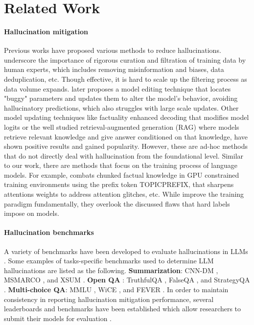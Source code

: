\section{Related Work}
\paragraph{Hallucination mitigation}
Previous works have proposed various methods to reduce hallucinations. 
\citet{radford2019language} underscore the importance of rigorous curation and filtration of training data by human experts, which includes removing misinformation and biases, data deduplication, etc. Though effective, it is hard to scale up the filtering process as data volume expands. 
\citet{meng2022locating} later proposes a model editing technique that locates "buggy" parameters and updates them to alter the model's behavior, avoiding hallucinatory predictions, which also struggles with large scale updates. 
Other model updating techniques like factuality enhanced decoding that modifies model logits \cite{lee2022factuality} or the well studied retrieval-augmented generation (RAG) \cite{shuster2021retrieval, lewis2020retrieval, guu2020retrieval} where models retrieve relevant knowledge and give answer conditioned on that knowledge, have shown positive results and gained popularity. However, these are ad-hoc methods that do not directly deal with hallucination from the foundational level. 
Similar to our work, there are methods that focus on the training process of language models. 
For example, \citet{lee2022factuality} combats chunked factual knowledge in GPU constrained training environments using the prefix token TOPICPREFIX, \cite{liu2024exposing} that sharpens attentions weights to address attention glitches, etc. While improve the training paradigm fundamentally, they overlook the discussed flaws that hard labels impose on models.

\paragraph{Hallucination benchmarks}
A variety of benchmarks have been developed to evaluate hallucinations in LLMs \cite{tonmoy2024comprehensive}. Some examples of tasks-specific benchmarks used to determine LLM hallucinations are listed as the following.
\textbf{Summarization}: CNN-DM \cite{see-etal-2017-get}, MSMARCO \cite{msmarco}, and XSUM \cite{narayan-etal-2018-dont}.
\textbf{Open QA} : TruthfulQA \cite{lin2022truthfulqa}, FalseQA \cite{hu-etal-2023-wont}, and StrategyQA \cite{geva-etal-2021-aristotle}.
\textbf{Multi-choice QA}: MMLU \cite{mmlu}, WiCE \cite{kamoi-etal-2023-wice}, and FEVER \cite{thorne-etal-2018-fever}.
In order to maintain consistency in reporting hallucination mitigation performance, several leaderboards and benchmarks have been established which allow researchers to submit their models for evaluation \cite{hong2024hallucinations, hughes_vectara_2023, li2023halueval}.


